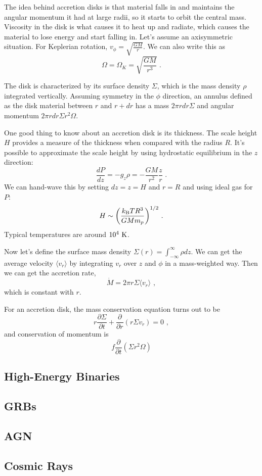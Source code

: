 The idea behind accretion disks is that material falls in and maintains the angular momentum it had at large radii, so it starts to orbit the central mass. Viscosity in the disk is what causes it to heat up and radiate, which causes the material to lose energy and start falling in. Let's assume an axisymmetric situation. For Keplerian rotation, $v_\phi = \sqrt{\frac{GM}{r}}$. We can also write this as
\begin{equation}
\Omega = \Omega_K = \sqrt{\frac{GM}{r^3}}\,\,.
\end{equation}

The disk is characterized by its surface density $\Sigma$, which is the mass density $\rho$ integrated vertically. Assuming symmetry in the $\phi$ direction, an annulus defined as the disk material between $r$ and $r+dr$ has a mass $2 \pi r dr \Sigma$ and angular momentum $2 \pi r dr \Sigma r^2 \Omega$. 



One good thing to know about an accretion disk is its thickness. The scale height $H$ provides a measure of the thickness when compared with the radius $R$. It's possible to approximate the scale height by using hydrostatic equilibrium in the $z$ direction:
\begin{equation}
\frac{dP}{dz} = -g_z \rho = -\frac{GM}{r^2} \frac{z}{r}\,\,.
\end{equation}
We can hand-wave this by setting $dz = z = H$ and $r = R$ and using ideal gas for $P$:
\begin{equation}
H \sim \biggl( \frac{k_{\rm B} T R^3}{GM m_p}\biggr)^{1/2}\,\,.
\end{equation}
Typical temperatures are around $10^4~{\rm K}$.

Now let's define the surface mass density $\Sigma(r) = \int^\infty_{-\infty} \rho dz$. We can get the average velocity $\langle v_r \rangle$ by integrating $v_r$ over $z$ and $\phi$ in a mass-weighted way. Then we can get the accretion rate,
\begin{equation}
\dot{M} = 2 \pi r \Sigma \langle v_r \rangle\,\, ,
\end{equation}
which is constant with $r$.

For an accretion disk, the mass conservation equation turns out to be
\begin{equation}
r \frac{\partial \Sigma}{\partial t} + \frac{\partial}{\partial r} (r \Sigma v_r) = 0\,\,,
\end{equation}
and conservation of momentum is
\begin{equation}
f \frac{\partial}{\partial t} (\Sigma r^2 \Omega)
\end{equation}

\subsection{High-Energy Binaries}

\subsection{GRBs}

\subsection{AGN}

\subsection{Cosmic Rays}

